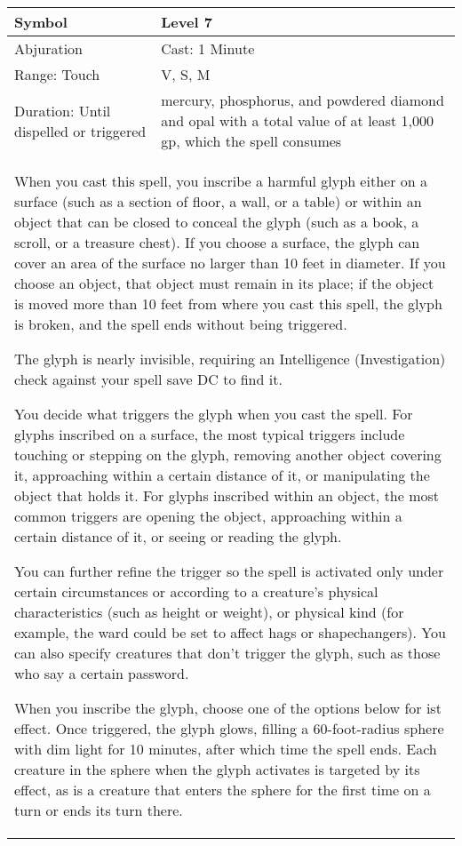 \documentclass[11pt]{report}
\begin{document}
\begin{table}[H]
	\begin{tabular}{||p{6cm}|p{6cm}||}
		\hline\hline
		\bf{Symbol} & Level 7\\ \hline
		Abjuration & Cast: 1 Minute\\ \hline
		Range: Touch & V, S, M\\ \hline
		Duration: Until dispelled or triggered & mercury, phosphorus, and powdered diamond and opal with a total value of at least 1,000 gp, which the spell consumes\\ \hline
		\multicolumn{2}{||p{12cm}||}{When you cast this spell, you inscribe a harmful glyph either on a surface (such as a section of floor, a wall, or a table) or within an object that can be closed to conceal the glyph (such as a book, a scroll, or a treasure chest).
If you choose a surface, the glyph can cover an area of the surface no larger than 10 feet in diameter. If you choose an object, that object must remain in its place; if the object is moved more than 10 feet from where you cast this spell, the glyph is broken, and the spell ends without being triggered.

The glyph is nearly invisible, requiring an Intelligence (Investigation) check against your spell save DC to find it.

You decide what triggers the glyph when you cast the spell. For glyphs inscribed on a surface, the most typical triggers include touching or stepping on the glyph, removing another object covering it, approaching within a certain distance of it, or manipulating the object that holds it. For glyphs inscribed within an object, the most common triggers are opening the object, approaching within a certain distance of it, or seeing or reading the glyph.

You can further refine the trigger so the spell is activated only under certain circumstances or according to a creature's physical characteristics (such as height or weight), or physical kind (for example, the ward could be set to affect hags or shapechangers). You can also specify creatures that don't trigger the glyph, such as those who say a certain password.

When you inscribe the glyph, choose one of the options below for ist effect. Once triggered, the glyph glows, filling a 60-foot-radius sphere with dim light for 10 minutes, after which time the spell ends. Each creature in the sphere when the glyph activates is targeted by its effect, as is a creature that enters the sphere for the first time on a turn or ends its turn there.

}
\end{tabular}
\end{table}
\end{document}
